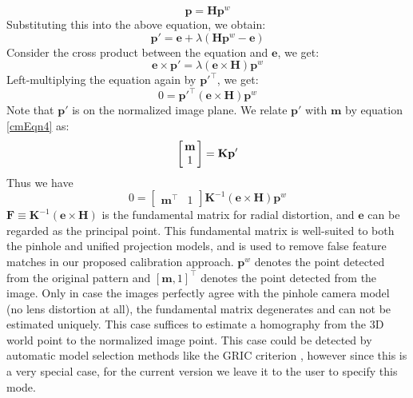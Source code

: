 \documentclass{report}
\begin{document}
\begin{equation}
\mathbf{p} = \mathbf{H} \mathbf{p}^w
\end{equation}
Substituting this into the above equation, we obtain: 
\begin{equation}
\mathbf{p}' = \mathbf{e} + \lambda (\mathbf{H} \mathbf{p}^w - \mathbf{e})
\end{equation}
Consider the cross product between the equation and $\mathbf{e}$, we get:
\begin{equation}
{}\mathbf{e} \times \mathbf{p}' = \lambda (\mathbf{e} \times \mathbf{H}) \mathbf{p}^w
\end{equation}
Left-multiplying the equation again by ${\mathbf{p}'}^\top$, we get:
\begin{equation}
0 = {\mathbf{p}'}^\top (\mathbf{e} \times \mathbf{H}) \mathbf{p}^w
\end{equation}
Note that $\mathbf{p}'$ is on the normalized image plane. We relate $\mathbf{p}'$ with $\mathbf{m}$ by equation \ref{cmEqn4} as: 
\begin{equation}
\arraycolsep=1.5pt%
\begin{bmatrix}
	\begin{array}{c}
	\mathbf{m}\\ 1
	\end{array}
\end{bmatrix} = 
\mathbf{K}
\mathbf{p}'
\end{equation}
Thus we have 
\begin{equation}
0 = 
\begin{bmatrix}
	\mathbf{m}^\top & 1
\end{bmatrix} 
\mathbf{K}^{-1} (\mathbf{e} \times \mathbf{H}) \mathbf{p}^w
\end{equation}
$\mathbf{F} \equiv \mathbf{K}^{-1} (\mathbf{e} \times \mathbf{H})$ is the fundamental matrix for radial distortion, and $\mathbf{e}$ can be regarded as the principal point. This fundamental matrix is well-suited to both the pinhole and unified projection models, and is used to remove false feature matches in our proposed calibration approach. $\mathbf{p}^w$ denotes the point detected from the original pattern and $[\mathbf{m}, 1]^\top$ denotes the point detected from the image. Only in case the images perfectly agree with the pinhole camera model (no lens distortion at all), the fundamental matrix degenerates and can not be estimated uniquely. This case suffices to estimate a homography from the 3D world point to the normalized image point. 
This case could be detected by automatic model selection methods like the GRIC criterion \cite{torr1997assessment}, however since this is a very special case, for the current version we leave it to the user to specify this mode.
\end{document}
